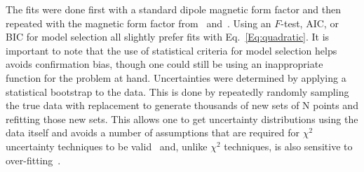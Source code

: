 \documentclass[10pt,aps,prc,twocolumn]{revtex4-1}
\begin{document}
The fits were done first with a standard dipole magnetic form factor
and then repeated with the magnetic form factor from~\cite{Bernauer:2013tpr} and~\cite{Ye:2017gyb}.    
Using an $F$-test, AIC, or BIC for model selection all slightly prefer fits with Eq.~\ref{Eq:quadratic}.
It is important to note that the use of statistical criteria for model selection helps avoids confirmation bias,
though one could still be using an inappropriate function for the problem at hand. 
Uncertainties were determined by applying a statistical bootstrap to the data.   This is done
by repeatedly randomly sampling the true data with replacement to generate thousands of new sets of N points 
and refitting those new sets.   This allows one to get uncertainty distributions using the data itself and
avoids a number of assumptions that are required for $\chi^2$ uncertainty techniques 
to be valid~\cite{Efron:1979} and, unlike $\chi^2$ techniques, is also sensitive to over-fitting~\cite{Andrae:2010}.
\end{document}
